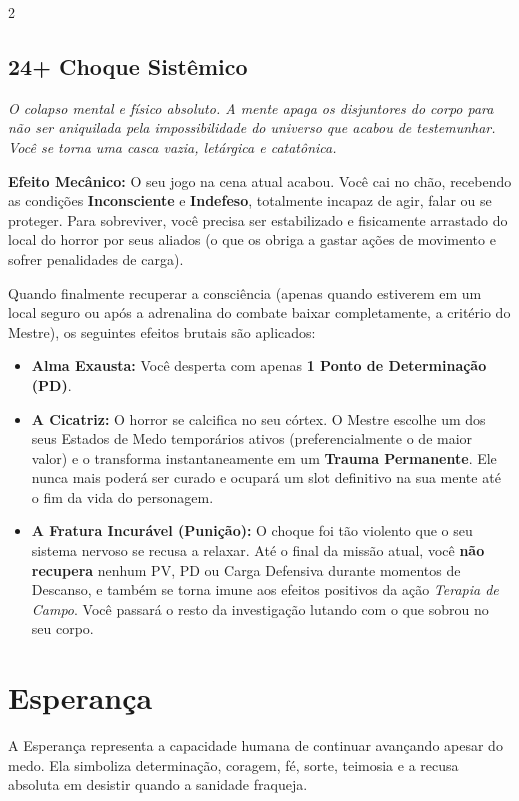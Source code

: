 \documentclass[a4paper,11pt,openany]{book}
\begin{document}
\begin{multicols}{2}
\subsection*{24+ Choque Sistêmico}
\textit{O colapso mental e físico absoluto. A mente apaga os disjuntores do corpo para não ser aniquilada pela impossibilidade do universo que acabou de testemunhar. Você se torna uma casca vazia, letárgica e catatônica.}

\textbf{Efeito Mecânico:} O seu jogo na cena atual acabou. Você cai no chão, recebendo as condições \textbf{Inconsciente} e \textbf{Indefeso}, totalmente incapaz de agir, falar ou se proteger. Para sobreviver, você precisa ser estabilizado e fisicamente arrastado do local do horror por seus aliados (o que os obriga a gastar ações de movimento e sofrer penalidades de carga).

Quando finalmente recuperar a consciência (apenas quando estiverem em um local seguro ou após a adrenalina do combate baixar completamente, a critério do Mestre), os seguintes efeitos brutais são aplicados:
\begin{itemize}
    \item \textbf{Alma Exausta:} Você desperta com apenas \textbf{1 Ponto de Determinação (PD)}.
    \item \textbf{A Cicatriz:} O horror se calcifica no seu córtex. O Mestre escolhe um dos seus Estados de Medo temporários ativos (preferencialmente o de maior valor) e o transforma instantaneamente em um \textbf{Trauma Permanente}. Ele nunca mais poderá ser curado e ocupará um slot definitivo na sua mente até o fim da vida do personagem.
    \item \textbf{A Fratura Incurável (Punição):} O choque foi tão violento que o seu sistema nervoso se recusa a relaxar. Até o final da missão atual, você \textbf{não recupera} nenhum PV, PD ou Carga Defensiva durante momentos de Descanso, e também se torna imune aos efeitos positivos da ação \textit{Terapia de Campo}. Você passará o resto da investigação lutando com o que sobrou no seu corpo.
\end{itemize}

\section{Esperança}

A Esperança representa a capacidade humana de continuar avançando apesar do medo. Ela simboliza determinação, coragem, fé, sorte, teimosia e a recusa absoluta em desistir quando a sanidade fraqueja.


\end{multicols}
\end{document}
